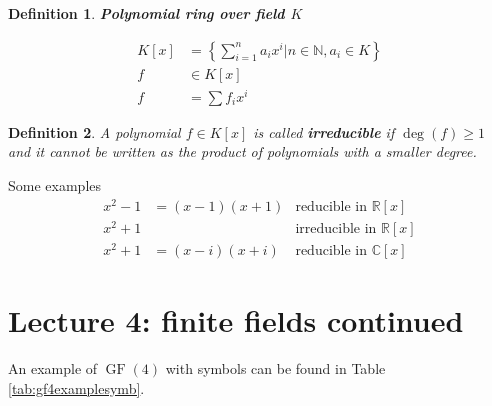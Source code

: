 \documentclass{article}
\newtheorem{definition}{Definition}
\newcommand{\NN}{\mathbb{N}}
\newcommand{\CC}{\mathbb{C}}
\newcommand{\RR}{\mathbb{R}}
\newcommand{\GF}{\operatorname{GF}}
\begin{document}
\begin{definition}
    \textbf{Polynomial ring over field $K$}

    \begin{align*}
        K[x] &= \left\{ \sum_{i=1}^n a_i x^i | n \in \NN, a_i \in K \right\} \\
        f &\in K[x] \\
        f &= \sum f_i x^i
    \end{align*}

\end{definition}

\begin{definition}
    A polynomial $f \in K[x]$ is called \textbf{irreducible} if $\deg(f) \ge 1$ and it cannot be
    written as the product of polynomials with a smaller degree.
\end{definition}

Some examples
\begin{align*}
    x^2 - 1 & = (x-1)(x+1) & \text{reducible in $\RR[x]$}  \\
    x^2 + 1 &              & \text{irreducible in $\RR[x]$} \\
    x^2 + 1 & = (x - i)(x + i) & \text{reducible in $\CC[x]$}
\end{align*}

\section{Lecture 4: finite fields continued}

An example of $\GF(4)$ with symbols can be found in Table \ref{tab:gf4examplesymb}.
\end{document}
